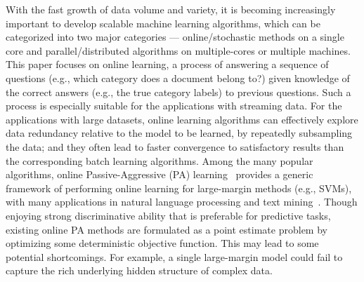\documentclass[twoside,11pt]{article}
\begin{document}

With the fast growth of data volume and variety, it is becoming increasingly important to develop scalable machine learning algorithms, which can be categorized into two major categories --- online/stochastic methods on a single core and parallel/distributed algorithms on multiple-cores or multiple machines. %
This paper focuses on online learning, a process of answering a sequence of questions (e.g., which category does a document belong to?) given knowledge of the correct answers (e.g., the true category labels) to previous questions. Such a process is especially suitable for the applications with streaming data. For the applications with large datasets, online learning algorithms can effectively explore data redundancy relative to the model to be learned, by repeatedly subsampling the data; and they often lead to faster convergence to satisfactory results than the corresponding batch learning  algorithms. Among the many popular algorithms, online Passive-Aggressive (PA) learning~\citep{crammer2006pa} provides a generic framework of performing online learning for large-margin methods (e.g., SVMs), with many applications in natural language processing and text mining~\citep{McDonald2005parsing, chiang2008emnlp}. Though enjoying strong discriminative ability that is preferable for predictive tasks, existing online PA methods are formulated as a point estimate problem by optimizing some deterministic objective function. This may lead to some potential shortcomings. For example, a single large-margin model could fail to capture the rich underlying hidden structure of complex data. %
\end{document}

